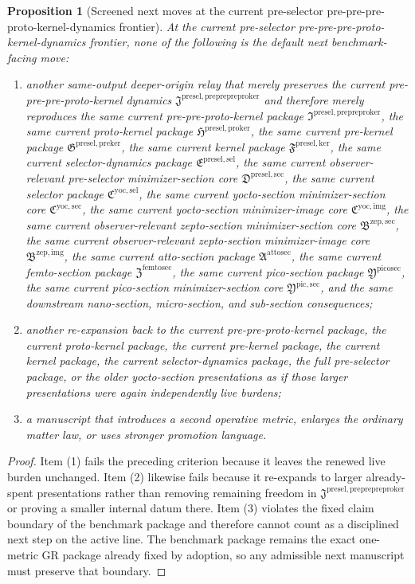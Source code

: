 \documentclass[11pt]{article}
\newcommand{\PrePrePreProtoKernelPackage}{\mathfrak J^{\mathrm{presel,preprepreproker}}}
\newcommand{\PrePreProtoKernelPackage}{\mathfrak I^{\mathrm{presel,prepreproker}}}
\newcommand{\ProtoKernelPackage}{\mathfrak H^{\mathrm{presel,proker}}}
\newcommand{\PreKernelPackage}{\mathfrak G^{\mathrm{presel,preker}}}
\newcommand{\KernelPackage}{\mathfrak F^{\mathrm{presel,ker}}}
\newcommand{\PreSectionSelectorPackage}{\mathfrak E^{\mathrm{presel,sel}}}
\newcommand{\PreSelectorMinSectionCore}{\mathfrak D^{\mathrm{presel,sec}}}
\newcommand{\YoctoSelectorPackage}{\mathfrak C^{\mathrm{yoc,sel}}}
\newcommand{\YoctoImageCore}{\mathfrak C^{\mathrm{yoc,img}}}
\newcommand{\YoctoMinSectionCore}{\mathfrak C^{\mathrm{yoc,sec}}}
\newcommand{\ZeptoImageCore}{\mathfrak B^{\mathrm{zep,img}}}
\newcommand{\ZeptoMinSectionCore}{\mathfrak B^{\mathrm{zep,sec}}}
\newcommand{\AttoSectionPackage}{\mathfrak A^{\mathrm{attosec}}}
\newcommand{\FemtoSectionPackage}{\mathfrak Z^{\mathrm{femtosec}}}
\newcommand{\PicoSectionPackage}{\mathfrak Y^{\mathrm{picosec}}}
\newcommand{\PicoMinSectionCore}{\mathfrak Y^{\mathrm{pic,sec}}}
\newtheorem{proposition}{Proposition}
\begin{document}
\begin{proposition}[Screened next moves at the current pre-selector pre-pre-pre-proto-kernel-dynamics frontier]
At the current pre-selector pre-pre-pre-proto-kernel-dynamics frontier, none of the following is the default next benchmark-facing move:
\begin{enumerate}
    \item another same-output deeper-origin relay that merely preserves the current pre-pre-pre-proto-kernel dynamics \(\PrePrePreProtoKernelPackage\) and therefore merely reproduces the same current pre-pre-proto-kernel package \(\PrePreProtoKernelPackage\), the same current proto-kernel package \(\ProtoKernelPackage\), the same current pre-kernel package \(\PreKernelPackage\), the same current kernel package \(\KernelPackage\), the same current selector-dynamics package \(\PreSectionSelectorPackage\), the same current observer-relevant pre-selector minimizer-section core \(\PreSelectorMinSectionCore\), the same current selector package \(\YoctoSelectorPackage\), the same current yocto-section minimizer-section core \(\YoctoMinSectionCore\), the same current yocto-section minimizer-image core \(\YoctoImageCore\), the same current observer-relevant zepto-section minimizer-section core \(\ZeptoMinSectionCore\), the same current observer-relevant zepto-section minimizer-image core \(\ZeptoImageCore\), the same current atto-section package \(\AttoSectionPackage\), the same current femto-section package \(\FemtoSectionPackage\), the same current pico-section package \(\PicoSectionPackage\), the same current pico-section minimizer-section core \(\PicoMinSectionCore\), and the same downstream nano-section, micro-section, and sub-section consequences;
    \item another re-expansion back to the current pre-pre-proto-kernel package, the current proto-kernel package, the current pre-kernel package, the current kernel package, the current selector-dynamics package, the full pre-selector package, or the older yocto-section presentations as if those larger presentations were again independently live burdens;
    \item a manuscript that introduces a second operative metric, enlarges the ordinary matter law, or uses stronger promotion language.
\end{enumerate}
\end{proposition}

\begin{proof}
Item (1) fails the preceding criterion because it leaves the renewed live burden unchanged. Item (2) likewise fails because it re-expands to larger already-spent presentations rather than removing remaining freedom in \(\PrePrePreProtoKernelPackage\) or proving a smaller internal datum there. Item (3) violates the fixed claim boundary of the benchmark package and therefore cannot count as a disciplined next step on the active line. The benchmark package remains the exact one-metric GR package already fixed by adoption, so any admissible next manuscript must preserve that boundary.
\end{proof}
\end{document}
